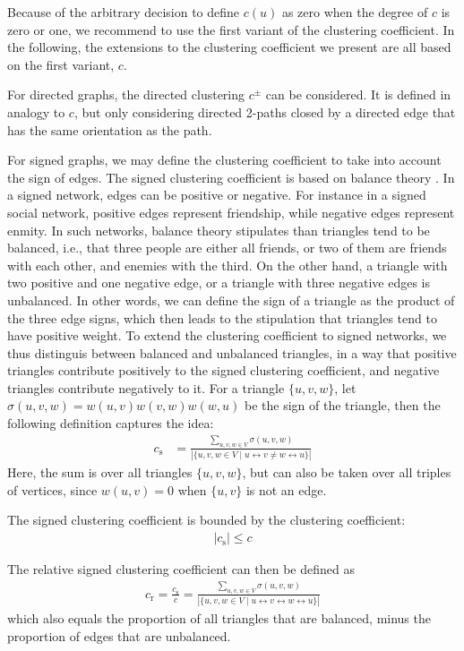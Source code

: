 \documentclass{article}
\begin{document}
Because of the arbitrary decision to define $c(u)$ as zero when the
degree of $c$ is zero or one, we recommend to use the first variant of
the clustering coefficient.  In the following, the extensions to the
clustering coefficient we present are all based on the first variant,
$c$.

For directed graphs, the directed clustering $c^{\pm}$ can be considered.  It is
defined in analogy to $c$, but only considering directed 2-paths closed
by a directed edge that has the same orientation as the path. 

For signed graphs, we may define the clustering coefficient to take into
account the sign of edges.  The signed clustering coefficient is based
on balance theory \citep{kunegis:slashdot-zoo}.  In a signed network,
edges can be positive or negative.  For instance in a signed social
network, positive edges represent friendship, while negative edges
represent enmity.  In such networks, balance theory stipulates than
triangles tend to be balanced, i.e., that three people are either all
friends, or two of them are friends with each other, and enemies with
the third.  On the other hand, a triangle with two positive and one
negative edge, or a triangle with three negative edges is unbalanced.
In other words, we can define the sign of a triangle as the product of
the three edge signs, which then leads to the stipulation that triangles
tend to have positive weight.  To extend the clustering coefficient to
signed networks, we thus distinguis between balanced and unbalanced
triangles, in a way that positive triangles contribute positively to the
signed clustering coefficient, and negative triangles contribute
negatively to it.  For a triangle $\{u,v,w\}$, let
$\sigma(u,v,w)=w(u,v)w(v,w)w(w,u)$ be the sign of the triangle, then the
following definition captures the idea:
\begin{align}
  c_{\mathrm s} &= \frac {\sum_{u,v,w\in V} \sigma(u,v,w)} {|\{ u, v, w
    \in V \mid u \leftrightarrow v \neq w \leftrightarrow u \}|}
\end{align}
Here, the sum is over all triangles $\{u,v,w\}$, but can also be taken
over all triples of vertices, since $w(u,v)=0$ when $\{u,v\}$ is not an
edge.

The signed clustering coefficient is bounded by the clustering
coefficient:
\begin{align}
  | c_{\mathrm s} | \leq c
\end{align}

The relative signed clustering coefficient can then be defined as
\begin{align}
  c_{\mathrm r} = \frac {c_{\mathrm s}} c = \frac {\sum_{u,v,w\in V}
    \sigma(u,v,w)} {|\{ u, v, w \in V \mid u \leftrightarrow v \leftrightarrow w \leftrightarrow u \}|}
\end{align}
which also equals the proportion of all triangles that are balanced,
minus the proportion of edges that are unbalanced.
\end{document}

